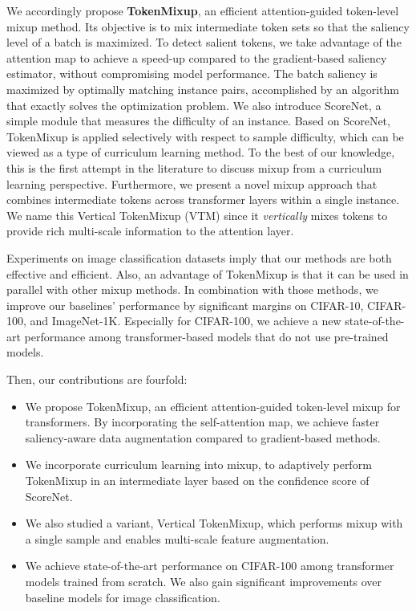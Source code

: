 \documentclass{article}
\begin{document}
We accordingly propose \textbf{TokenMixup}, an efficient attention-guided token-level mixup method.
Its objective is to mix intermediate token sets so that the saliency level of a batch is maximized.
To detect salient tokens, we take advantage of the attention map to achieve a  speed-up compared to the gradient-based saliency estimator, without compromising model performance.
The batch saliency is maximized by optimally matching instance pairs, accomplished by an algorithm that exactly solves the optimization problem.
We also introduce ScoreNet, a simple module that measures the difficulty of an instance.
Based on ScoreNet, TokenMixup is applied selectively with respect to sample difficulty, which can be viewed as a type of curriculum learning method.
To the best of our knowledge, this is the first attempt in the literature to discuss mixup from a curriculum learning perspective.
Furthermore, we present a novel mixup approach that combines intermediate tokens across transformer layers within a single instance.
We name this Vertical TokenMixup (VTM) since it \textit{vertically} mixes tokens to provide rich multi-scale information to the attention layer.

Experiments on image classification datasets imply that our methods are both effective and efficient.
Also, an advantage of TokenMixup is that it can be used in parallel with other mixup methods.
In combination with those methods, we improve our baselines' performance by significant
margins on CIFAR-10, CIFAR-100, and ImageNet-1K.
Especially for CIFAR-100, we achieve a new state-of-the-art performance among transformer-based models that do not use pre-trained models.

Then, our contributions are fourfold:
\begin{itemize}[leftmargin=*]
\item We propose TokenMixup, an efficient attention-guided token-level mixup for transformers. By incorporating the self-attention map, we achieve  faster saliency-aware data augmentation compared to gradient-based methods.
\item We incorporate curriculum learning into mixup, to adaptively perform TokenMixup in an intermediate layer based on the confidence score of ScoreNet.

\item We also studied a variant, Vertical TokenMixup, which performs mixup with a single sample and enables multi-scale feature augmentation.

\item We achieve state-of-the-art performance on CIFAR-100 among transformer models trained from scratch. We also gain significant improvements over baseline models for image classification.
\end{itemize}
\end{document}
